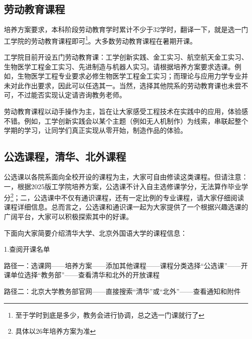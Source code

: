 \subsection{劳动教育课程}
培养方案要求，本科阶段劳动教育学时累计不少于32学时，翻译一下，就是选一门工学院的劳动教育课程即可\footnote{至于学时到底是多少，教务会进行协调，总之选一门课就行了}。大多数劳动教育课程在暑期开课。

\vspace{10pt}

工学院目前开设五门劳动教育课：工学创新实践、金工实习、航空航天金工实习、生物医学工程金工实习、先进制造与机器人实习。请根据培养方案要求选课。例如，生物医学工程专业要求必修生物医学工程金工实习；而理论与应用力学专业并未对此作出要求，因此可以任选其一。当然，选择其他院系的劳动教育课也未尝不可，不过能否实现认定请咨询教务老师。

\vspace{10pt}

劳动教育课程以动手操作为主，旨在让大家感受工程技术在实践中的应用，体验感不错。例如，工学创新实践会以某个主题（例如无人机制作）为线索，串联起整个学期的学习，让同学们真正实现从零开始，制造作品的体验。

\subsection{公选课程，清华、北外课程}
公选课以各院系面向全校开设的课程为主，大家可自由修读这类课程。但请注意：一，根据2025版工学院培养方案，公选课不计入自主选修课学分，无法算作毕业学分\footnote{具体以26年培养方案为准}；二，公选课中不仅有通识课程，还有一定比例的专业课程，请大家仔细阅读课程详细信息。总而言之，公选课和通识课一起为大家提供了一个根据兴趣选课的广阔平台，大家可以积极探索其中的好课。

\vspace{10pt}

下面向大家简要介绍清华大学、北京外国语大学的课程信息：

\vspace{10pt}

1.查阅开课名单

\vspace{10pt}

路径一：选课网——培养方案——添加其他课程——课程分类选择“公选课”——开课单位选择“教务部”——查看清华和北外的开放课程

\vspace{10pt}

路径二：北京大学教务部官网——直接搜索“清华”或“北外”——查看通知和附件

